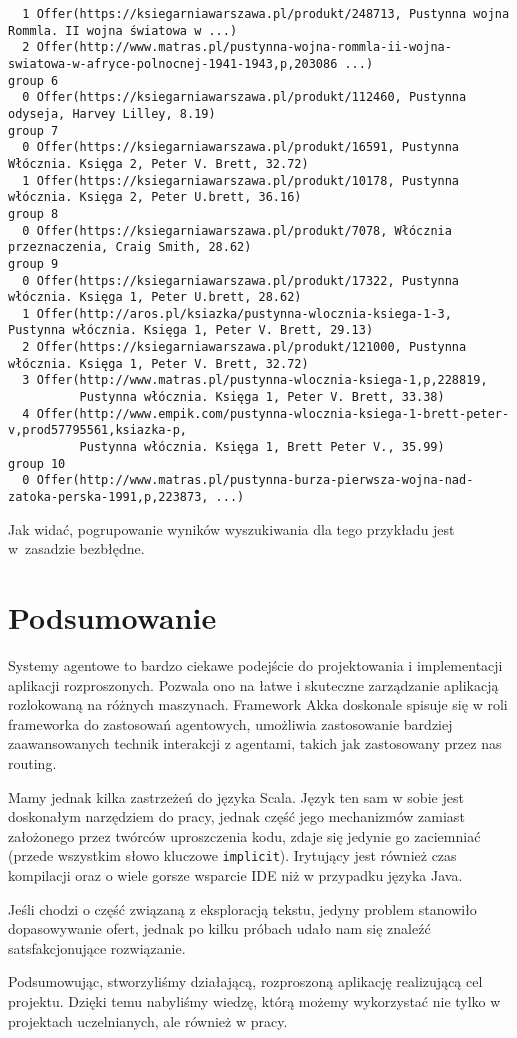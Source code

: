\documentclass[a4paper,12pt]{mwart}
\begin{document}
\begin{verbatim}
  1 Offer(https://ksiegarniawarszawa.pl/produkt/248713, Pustynna wojna Rommla. II wojna światowa w ...)
  2 Offer(http://www.matras.pl/pustynna-wojna-rommla-ii-wojna-swiatowa-w-afryce-polnocnej-1941-1943,p,203086 ...)
group 6
  0 Offer(https://ksiegarniawarszawa.pl/produkt/112460, Pustynna odyseja, Harvey Lilley, 8.19)
group 7
  0 Offer(https://ksiegarniawarszawa.pl/produkt/16591, Pustynna Włócznia. Księga 2, Peter V. Brett, 32.72)
  1 Offer(https://ksiegarniawarszawa.pl/produkt/10178, Pustynna włócznia. Księga 2, Peter U.brett, 36.16)
group 8
  0 Offer(https://ksiegarniawarszawa.pl/produkt/7078, Włócznia przeznaczenia, Craig Smith, 28.62)
group 9
  0 Offer(https://ksiegarniawarszawa.pl/produkt/17322, Pustynna włócznia. Księga 1, Peter U.brett, 28.62)
  1 Offer(http://aros.pl/ksiazka/pustynna-wlocznia-ksiega-1-3, Pustynna włócznia. Księga 1, Peter V. Brett, 29.13)
  2 Offer(https://ksiegarniawarszawa.pl/produkt/121000, Pustynna włócznia. Księga 1, Peter V. Brett, 32.72)
  3 Offer(http://www.matras.pl/pustynna-wlocznia-ksiega-1,p,228819,
          Pustynna włócznia. Księga 1, Peter V. Brett, 33.38)
  4 Offer(http://www.empik.com/pustynna-wlocznia-ksiega-1-brett-peter-v,prod57795561,ksiazka-p,
          Pustynna włócznia. Księga 1, Brett Peter V., 35.99)
group 10
  0 Offer(http://www.matras.pl/pustynna-burza-pierwsza-wojna-nad-zatoka-perska-1991,p,223873, ...)
\end{verbatim}
\normalsize

Jak widać, pogrupowanie wyników wyszukiwania dla tego przykładu jest w~zasadzie
bezbłędne.

\section{Podsumowanie}
Systemy agentowe to bardzo ciekawe podejście do projektowania i implementacji
aplikacji rozproszonych. Pozwala ono na łatwe i skuteczne zarządzanie aplikacją
rozlokowaną na różnych maszynach. Framework Akka doskonale spisuje się w roli
frameworka do zastosowań agentowych, umożliwia zastosowanie bardziej
zaawansowanych technik interakcji z agentami, takich jak zastosowany przez nas
routing.

Mamy jednak kilka zastrzeżeń do języka Scala. Język ten sam w sobie
jest doskonałym narzędziem do pracy, jednak część jego mechanizmów zamiast
założonego przez twórców uproszczenia kodu, zdaje się jedynie go zaciemniać
(przede wszystkim słowo kluczowe \verb+implicit+).
Irytujący jest również czas kompilacji oraz o wiele gorsze wsparcie IDE niż
w przypadku języka Java.

Jeśli chodzi o część związaną z eksploracją tekstu, jedyny problem stanowiło
dopasowywanie ofert, jednak po kilku próbach udało nam się znaleźć
satsfakcjonujące rozwiązanie.

Podsumowując, stworzyliśmy działającą, rozproszoną aplikację
realizującą cel projektu. Dzięki temu nabyliśmy wiedzę, którą możemy wykorzystać
nie tylko w projektach uczelnianych, ale również w pracy.
\end{document}
